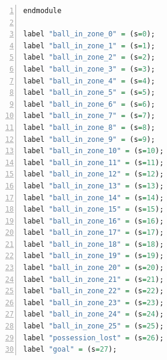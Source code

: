 \documentclass{l4proj}
\begin{document}
\begin{appendices}
\begin{lstlisting}[language=Haskell, numbers=left, caption=MDP used for strategy generation. This is the model specification as-is after the refinements at the end of chapter 3.]
endmodule

label "ball_in_zone_0" = (s=0);
label "ball_in_zone_1" = (s=1);
label "ball_in_zone_2" = (s=2);
label "ball_in_zone_3" = (s=3);
label "ball_in_zone_4" = (s=4);
label "ball_in_zone_5" = (s=5);
label "ball_in_zone_6" = (s=6);
label "ball_in_zone_7" = (s=7);
label "ball_in_zone_8" = (s=8);
label "ball_in_zone_9" = (s=9);
label "ball_in_zone_10" = (s=10);
label "ball_in_zone_11" = (s=11);
label "ball_in_zone_12" = (s=12);
label "ball_in_zone_13" = (s=13);
label "ball_in_zone_14" = (s=14);
label "ball_in_zone_15" = (s=15);
label "ball_in_zone_16" = (s=16);
label "ball_in_zone_17" = (s=17);
label "ball_in_zone_18" = (s=18);
label "ball_in_zone_19" = (s=19);
label "ball_in_zone_20" = (s=20);
label "ball_in_zone_21" = (s=21);
label "ball_in_zone_22" = (s=22);
label "ball_in_zone_23" = (s=23);
label "ball_in_zone_24" = (s=24);
label "ball_in_zone_25" = (s=25);
label "possession_lost" = (s=26);
label "goal" = (s=27);

\end{lstlisting}

\end{appendices}





\renewcommand{\thechapter}{0} 

\end{document}
